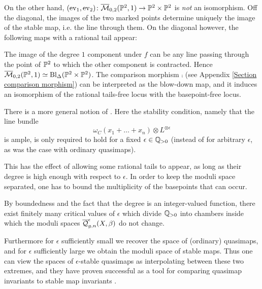 \begin{example}
On the other hand, $(\operatorname{ev}_1,\operatorname{ev}_2)\colon\overline{\mathcal M}_{0,2}(\mathbb P^2,1)\rightarrow\mathbb P^2\times\mathbb P^2$ is \emph{not} an isomorphism. Off the diagonal, the images of the two marked points determine uniquely the image of the stable map, i.e. the line through them. On the diagonal however, the following maps with a rational tail appear:
\begin{center}
\end{center}
The image of the degree $1$ component under $f$ can be any line passing through the point of $\mathbb P^2$ to which the other component is contracted. Hence $\overline{\mathcal M}_{0,2}(\mathbb P^2,1)\simeq\operatorname{Bl}_{\Delta}(\mathbb P^2\times\mathbb P^2)$. The comparison morphism $\comp$ (see Appendix \ref{Section comparison morphism}) can be interpreted as the blow-down map, and it induces an isomorphism of the rational tails-free locus with the basepoint-free locus.
\end{example}


\begin{remark}
 There is a more general notion of  \cite[\S 7.1]{CFKM}. Here the stability condition, namely that the line bundle
\begin{equation*} \omega_C(x_1 + \ldots + x_n)\otimes L^{\otimes \epsilon} \end{equation*} 
is ample, is only required to hold for a fixed $\epsilon \in \mathbb{Q}_{>0}$ (instead of for arbitrary $\epsilon$, as was the case with ordinary quasimaps).

This has the effect of allowing some rational tails to appear, as long as their degree is high enough with respect to $\epsilon$. In order to keep the moduli space separated, one has to bound the multiplicity of the basepoints that can occur.

By boundedness and the fact that the degree is an integer-valued function, there exist finitely many critical values of $\epsilon$ which divide $\mathbb{Q}_{>0}$ into chambers inside which the moduli spaces $\overline{\mathcal Q}^{\epsilon}_{g,n}(X,\beta)$ do not change.

Furthermore for $\epsilon$ sufficiently small we recover the space of (ordinary) quasimaps, and for $\epsilon$ sufficiently large we obtain the moduli space of stable maps. Thus one can view the spaces of $\epsilon$-stable quasimaps as interpolating between these two extremes, and they have proven  successful as a tool for comparing quasimap invariants to stable map invariants \cite{CF-K-wallcrossing}.
\end{remark}


